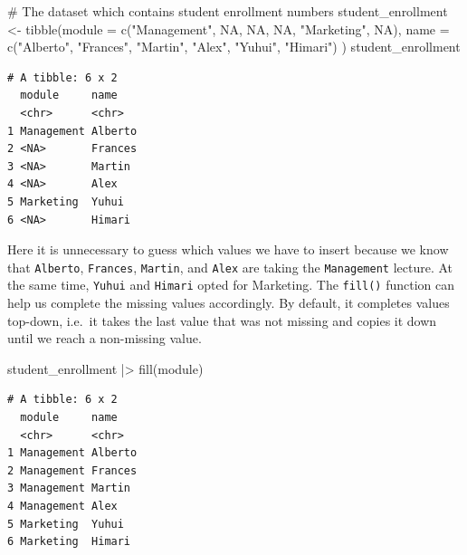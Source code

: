 \documentclass[
  letterpaper,
]{krantz}
\makeatletter
\newenvironment{Shaded}{\begin{snugshade}}{\end{snugshade}}
\newcommand{\AttributeTok}[1]{\textcolor[rgb]{0.40,0.45,0.13}{#1}}
\newcommand{\CommentTok}[1]{\textcolor[rgb]{0.37,0.37,0.37}{#1}}
\newcommand{\ConstantTok}[1]{\textcolor[rgb]{0.56,0.35,0.01}{#1}}
\newcommand{\FunctionTok}[1]{\textcolor[rgb]{0.28,0.35,0.67}{#1}}
\newcommand{\NormalTok}[1]{\textcolor[rgb]{0.00,0.23,0.31}{#1}}
\newcommand{\OtherTok}[1]{\textcolor[rgb]{0.00,0.23,0.31}{#1}}
\newcommand{\SpecialCharTok}[1]{\textcolor[rgb]{0.37,0.37,0.37}{#1}}
\newcommand{\StringTok}[1]{\textcolor[rgb]{0.13,0.47,0.30}{#1}}
\newenvironment{kframe}{%
\medskip{}
\setlength{\fboxsep}{.8em}
 \def\at@end@of@kframe{}%
 \ifinner\ifhmode%
  \def\at@end@of@kframe{\end{minipage}}%
  \begin{minipage}{\columnwidth}%
 \fi\fi%
 \def\FrameCommand##1{\hskip\@totalleftmargin \hskip-\fboxsep
 \colorbox{shadecolor}{##1}\hskip-\fboxsep
     \hskip-\linewidth \hskip-\@totalleftmargin \hskip\columnwidth}%
 \MakeFramed {\advance\hsize-\width
   \@totalleftmargin\z@ \linewidth\hsize
   \@setminipage}}%
 {\par\unskip\endMakeFramed%
 \at@end@of@kframe}
\renewenvironment{Shaded}{\begin{kframe}}{\end{kframe}}
\makeatother
\begin{document}
\begin{Shaded}
\begin{Highlighting}[]
\CommentTok{\# The dataset which contains student enrollment numbers}
\NormalTok{student\_enrollment }\OtherTok{\textless{}{-}} \FunctionTok{tibble}\NormalTok{(}\AttributeTok{module =} \FunctionTok{c}\NormalTok{(}\StringTok{"Management"}\NormalTok{, }\ConstantTok{NA}\NormalTok{, }\ConstantTok{NA}\NormalTok{,}
                                        \ConstantTok{NA}\NormalTok{, }\StringTok{"Marketing"}\NormalTok{, }\ConstantTok{NA}\NormalTok{),}
                             \AttributeTok{name =} \FunctionTok{c}\NormalTok{(}\StringTok{"Alberto"}\NormalTok{, }\StringTok{"Frances"}\NormalTok{, }\StringTok{"Martin"}\NormalTok{,}
                                    \StringTok{"Alex"}\NormalTok{, }\StringTok{"Yuhui"}\NormalTok{, }\StringTok{"Himari"}\NormalTok{)}
\NormalTok{                             )}
\NormalTok{student\_enrollment}
\end{Highlighting}
\end{Shaded}

\begin{verbatim}
# A tibble: 6 x 2
  module     name   
  <chr>      <chr>  
1 Management Alberto
2 <NA>       Frances
3 <NA>       Martin 
4 <NA>       Alex   
5 Marketing  Yuhui  
6 <NA>       Himari 
\end{verbatim}

Here it is unnecessary to guess which values we have to insert because
we know that \texttt{Alberto}, \texttt{Frances}, \texttt{Martin}, and
\texttt{Alex} are taking the \texttt{Management} lecture. At the same
time, \texttt{Yuhui} and \texttt{Himari} opted for Marketing. The
\texttt{fill()} function can help us complete the missing values
accordingly. By default, it completes values top-down, i.e.~it takes the
last value that was not missing and copies it down until we reach a
non-missing value.

\begin{Shaded}
\begin{Highlighting}[]
\NormalTok{student\_enrollment }\SpecialCharTok{|\textgreater{}} \FunctionTok{fill}\NormalTok{(module)}
\end{Highlighting}
\end{Shaded}

\begin{verbatim}
# A tibble: 6 x 2
  module     name   
  <chr>      <chr>  
1 Management Alberto
2 Management Frances
3 Management Martin 
4 Management Alex   
5 Marketing  Yuhui  
6 Marketing  Himari 
\end{verbatim}
\end{document}
